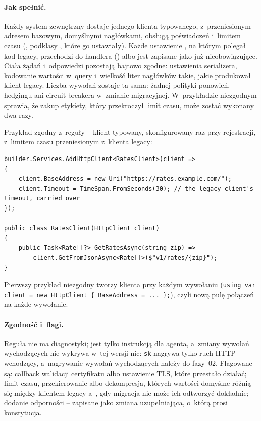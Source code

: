 \paragraph{Jak spełnić.} Każdy system zewnętrzny dostaje jednego klienta typowanego,
z~przeniesionym adresem bazowym, domyślnymi nagłówkami, obsługą poświadczeń i~limitem czasu
(, podklasy , które go ustawiały). Każde
ustawienie , na którym polegał kod legacy, przechodzi do
handlera () albo jest zapisane jako już
nieobowiązujące. Ciała żądań i~odpowiedzi pozostają bajtowo zgodne: ustawienia serializera,
kodowanie wartości w~query i~wielkość liter nagłówków takie, jakie produkował klient legacy.
Liczba wywołań zostaje ta sama: żadnej polityki ponowień, hedgingu ani circuit breakera
w~zmianie migracyjnej. W~przykładzie niezgodnym
 sprawia, że zakup
etykiety, który przekroczył limit czasu, może zostać wykonany dwa razy.

Przykład zgodny z~reguły -- klient typowany, skonfigurowany raz przy rejestracji, z~limitem
czasu przeniesionym z~klienta legacy:

\begin{lstlisting}
builder.Services.AddHttpClient<RatesClient>(client =>
{
    client.BaseAddress = new Uri("https://rates.example.com/");
    client.Timeout = TimeSpan.FromSeconds(30); // the legacy client's timeout, carried over
});

public class RatesClient(HttpClient client)
{
    public Task<Rate[]?> GetRatesAsync(string zip) =>
        client.GetFromJsonAsync<Rate[]>($"v1/rates/{zip}");
}
\end{lstlisting}

Pierwszy przykład niezgodny tworzy klienta przy każdym wywołaniu
(\texttt{using var client = new HttpClient \{ BaseAddress = ... \};}), czyli nową pulę
połączeń na każde wywołanie.

\paragraph{Zgodność i~flagi.} Reguła nie ma diagnostyki; jest tylko instrukcją dla agenta,
a~zmiany wywołań wychodzących nie wykrywa w~tej wersji nic: \texttt{sk} nagrywa tylko ruch HTTP
wchodzący, a~nagrywanie wywołań wychodzących należy do fazy~02. Flagowane są: callback walidacji
certyfikatu albo ustawienie TLS, które przestało działać; limit czasu, przekierowanie albo
dekompresja, których wartości domyślne różnią się między klientem legacy a~,
gdy migracja nie może ich odtworzyć dokładnie; dodanie odporności -- zapisane jako zmiana
uzupełniająca, o~którą prosi konstytucja.

